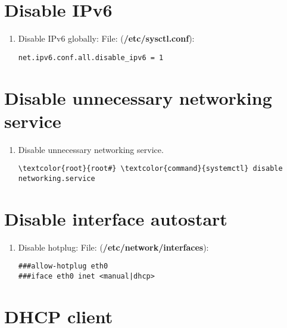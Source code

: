 \documentclass[10pt, a4paper, onecolumn, openany]{book} %
\begin{document}
\section{Disable IPv6}
\begin{enumerate}
    \item Disable IPv6 globally:
\newline File: (\textcolor{file}{\textbf{/etc/sysctl.conf}}):
\begin{Verbatim}[commandchars=\\\{\}]
net.ipv6.conf.all.disable_ipv6 = 1
\end{Verbatim}
\end{enumerate}
\section{Disable unnecessary networking service}
\begin{enumerate}
    \item Disable unnecessary networking service.
\begin{Verbatim}[commandchars=\\\{\}]
\textcolor{root}{root#} \textcolor{command}{systemctl} disable networking.service
\end{Verbatim}
\end{enumerate}
\section{Disable interface autostart}
\begin{enumerate}
    \item Disable hotplug:
\newline File: (\textbf{\textcolor{file}{/etc/network/interfaces}}):
\begin{Verbatim}[commandchars=\\\{\}]
###allow-hotplug eth0
###iface eth0 inet <manual|dhcp>
\end{Verbatim}
\end{enumerate}
\section{DHCP client}
\end{document}
